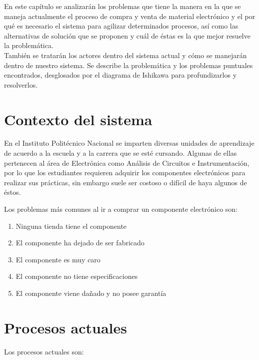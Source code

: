 En este capítulo se analizarán los problemas que tiene la manera en la que se maneja actualmente el proceso de compra y venta de material electrónico y el por qué es necesario el sistema para agilizar determinados procesos, así como las alternativas de solución que se proponen y cuál de éstas es la que mejor resuelve la problemática. \\

También se tratarán los actores dentro del sistema actual y cómo se manejarán dentro de nuestro sistema. Se describe la problemática y los problemas puntuales encontrados, desglosados por el diagrama de Ishikawa para profundizarlos y resolverlos.

\section{Contexto del sistema}

En el Instituto Politécnico Nacional se imparten diversas unidades de aprendizaje de acuerdo a la escuela y a la carrera que se esté cursando. Algunas de ellas pertenecen al área de Electrónica como Análisis de Circuitos e Instrumentación, por lo que los estudiantes requieren adquirir los componentes electrónicos para realizar sus prácticas, sin embargo suele ser costoso o difícil de haya algunos de éstos.

Los problemas más comunes al ir a comprar un componente electrónico son:
\begin{enumerate}
	\item Ninguna tienda tiene el componente
	\item El componente ha dejado de ser fabricado
	\item El componente es muy caro
	\item El componente no tiene especificaciones
	\item El componente viene dañado y no posee garantía
\end{enumerate}

\section{Procesos actuales}

Los procesos actuales son:

